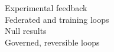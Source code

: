 Experimental feedback \citep{ax2611_07319,ax2611_23718}\\ Federated and training loops \citep{ax2611_08383,ax2611_11005}\\ Null results \citep{ax2611_17789}\\ Governed, reversible loops \citep{ax2611_13236,ax2611_10425}
